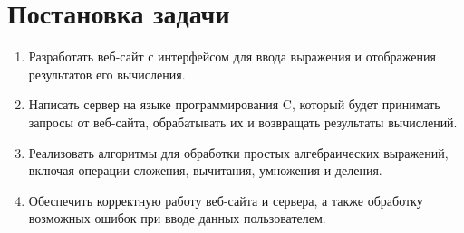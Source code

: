 \documentclass{article}
\begin{document}
            



            
        
        
        


    


    
    \renewcommand{\contentsname}{Содержание}
    
    \tableofcontents
    \newpage
    



    \section{Постановка задачи}

    \begin{enumerate}
        \item Разработать веб-сайт с интерфейсом для ввода выражения
        и отображения результатов его вычисления.
        
        \item Написать сервер на языке программирования C, 
        который будет принимать запросы от веб-сайта, обрабатывать 
        их и возвращать результаты вычислений.
        
        \item Реализовать алгоритмы для обработки простых алгебраических выражений, 
        включая операции сложения, вычитания, умножения и деления.
    
        \item Обеспечить корректную работу веб-сайта и сервера, 
        а также обработку возможных ошибок при вводе данных пользователем.
    \end{enumerate}
    
\end{document}
